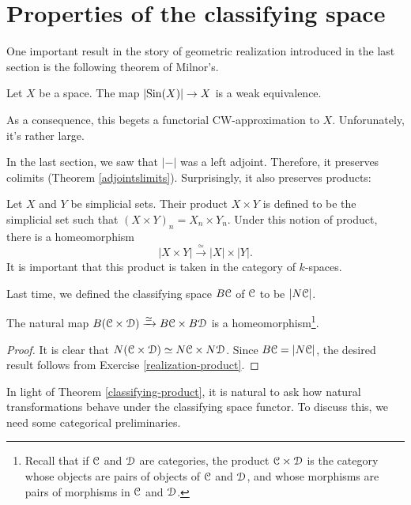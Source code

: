 \section{Properties of the classifying
space}\label{classifying-space-properties}

%
One important result in the story of geometric realization introduced in the
last section is the following theorem of Milnor's.
\begin{theorem}[Milnor]
    Let $X$ be a space. The map $|\mathrm{Sin}(X)|\to X$ is a weak equivalence.
\end{theorem}
As a consequence, this begets a functorial CW-approximation to $X$.
Unforunately, it's rather large.

In the last section, we saw that $|-|$ was a left adjoint. Therefore, it
preserves colimits (Theorem \ref{adjointslimits}). Surprisingly, it also
preserves products:
\begin{exercise}[Hard]\label{realization-product}
    Let $X$ and $Y$ be simplicial sets. Their product $X\times Y$ is defined to
    be the simplicial set such that $(X\times Y)_n = X_n\times Y_n$. Under this
    notion of product, there is a homeomorphism
    $$|X\times Y|\xrightarrow{\simeq} |X|\times |Y|.$$
    It is important that this product is taken in the category of $k$-spaces.
\end{exercise}

Last time, we defined the classifying space $B\mathcal C$ of $\mathcal C$ to be $|N\mathcal C|$.
\begin{theorem}\label{classifying-product}
    The natural map $B(\mathcal C\times\mathcal D)\xrightarrow{\simeq}B\mathcal C\times B\mathcal D$ is a
    homeomorphism\footnote{Recall that if $\mathcal C$ and $\mathcal D$ are categories, the
    product $\mathcal C\times\mathcal D$ is the category whose objects are pairs of objects
    of $\mathcal C$ and $\mathcal D$, and whose morphisms are pairs of morphisms in $\mathcal C$ and
    $\mathcal D$.}.
\end{theorem}
\begin{proof}
    It is clear that $N(\mathcal C\times\mathcal D) \simeq N\mathcal C\times N\mathcal D$. Since $B\mathcal C =
    |N\mathcal C|$, the desired result follows from Exercise
    \ref{realization-product}.
\end{proof}
In light of Theorem \ref{classifying-product}, it is natural to ask how natural
transformations behave under the classifying space functor. To discuss this, we
need some categorical preliminaries.

